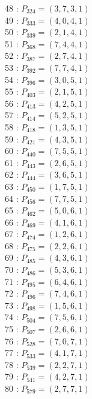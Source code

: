 \documentclass{article}
\begin{document}
{\begin{multicols}{3}
48 : $P_{324}=( 3, 7, 3, 1 )$\\
49 : $P_{333}=( 4, 0, 4, 1 )$\\
50 : $P_{339}=( 2, 1, 4, 1 )$\\
51 : $P_{368}=( 7, 4, 4, 1 )$\\
52 : $P_{387}=( 2, 7, 4, 1 )$\\
53 : $P_{392}=( 7, 7, 4, 1 )$\\
54 : $P_{396}=( 3, 0, 5, 1 )$\\
55 : $P_{403}=( 2, 1, 5, 1 )$\\
56 : $P_{413}=( 4, 2, 5, 1 )$\\
57 : $P_{414}=( 5, 2, 5, 1 )$\\
58 : $P_{418}=( 1, 3, 5, 1 )$\\
59 : $P_{421}=( 4, 3, 5, 1 )$\\
60 : $P_{440}=( 7, 5, 5, 1 )$\\
61 : $P_{443}=( 2, 6, 5, 1 )$\\
62 : $P_{444}=( 3, 6, 5, 1 )$\\
63 : $P_{450}=( 1, 7, 5, 1 )$\\
64 : $P_{456}=( 7, 7, 5, 1 )$\\
65 : $P_{462}=( 5, 0, 6, 1 )$\\
66 : $P_{469}=( 4, 1, 6, 1 )$\\
67 : $P_{474}=( 1, 2, 6, 1 )$\\
68 : $P_{475}=( 2, 2, 6, 1 )$\\
69 : $P_{485}=( 4, 3, 6, 1 )$\\
70 : $P_{486}=( 5, 3, 6, 1 )$\\
71 : $P_{495}=( 6, 4, 6, 1 )$\\
72 : $P_{496}=( 7, 4, 6, 1 )$\\
73 : $P_{498}=( 1, 5, 6, 1 )$\\
74 : $P_{504}=( 7, 5, 6, 1 )$\\
75 : $P_{507}=( 2, 6, 6, 1 )$\\
76 : $P_{528}=( 7, 0, 7, 1 )$\\
77 : $P_{533}=( 4, 1, 7, 1 )$\\
78 : $P_{539}=( 2, 2, 7, 1 )$\\
79 : $P_{541}=( 4, 2, 7, 1 )$\\
80 : $P_{579}=( 2, 7, 7, 1 )$\\
\end{multicols}


%


%


}%
\end{document}
